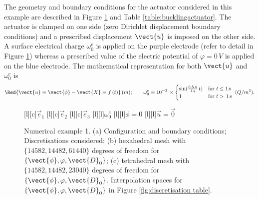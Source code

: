 The geometry and boundary conditions for the actuator considered in this example are described in Figure \ref{fig:bucklingactuator} and Table \ref{table:bucklingactuator}. The actuator is clamped on one side (zero Dirichlet displacement boundary conditions) and a prescribed displacement $\vect{u}$ is imposed on the other side. A surface electrical charge $\omega_0^e$ is applied on the purple electrode (refer to detail in Figure \ref{fig:bucklingactuator}) whereas a prescribed value of the electric potential of  $\varphi = 0\, V$ is applied on the blue electrode. The mathematical representation for both $\vect{u}$ and $\omega_0^e$ is
%
%
\begin{equation}
%
\Red{\vect{u} = \vect{\phi} - \vect{X}  =  f\left(t\right)}\,(m);\qquad
%
\omega_0^e = 10^{-3}\,\times
\begin{cases}
\sin(\frac{0.5\,\pi}{1\,\text{s}}\,t) & \text{for } t \leq 1\,\text{s} \\
1 & \text{for } t>\,1\,\text{s}  \\
\end{cases}\,\,(Q/m^2).
\end{equation}


%					

\begin{figure}[htbp]
 \centering
   [l][c]{{\small{$\vec{e}_1$}}}
   [l][c]{{\small{$\vec{e}_2$}}}
   [l][c]{{\small{$\vec{e}_3$}}}
   [l][l]{{$\omega_0^e$}}
   [l][l]{{$\phi=0$}}
   [l][l]{{$\vec{u}=\vec{0}$}}
  \caption{Numerical example 1. (a) Configuration and boundary conditions; Discretisations considered: (b) hexahedral mesh with $\{14582,14482,61440\}$ degrees of freedom for $\{\vect{\phi},\varphi,\vect{D}_0\}$; (c) tetrahedral mesh with $\{14582,14482,23040\}$ degrees of freedom for  $\{\vect{\phi},\varphi,\vect{D}_0\}$. Interpolation spaces for $\{\vect{\phi},\varphi,\vect{D}_0\}$ in Figure \ref{fig:discretisation table}.}
  \label{fig:bucklingactuator}
\end{figure}

